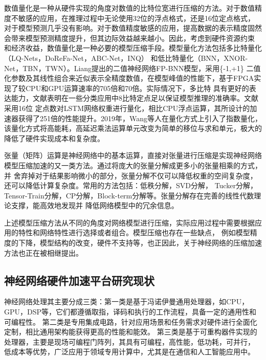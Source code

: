 数值量化是一种从硬件实现的角度对数值的比特位宽进行压缩的方法。对于数值精度不敏感的应用，在推理过程中无论使用32位的浮点格式，还是16位定点格式，
对于模型预测几乎没有影响。对于数值精度敏感的应用，提高数据的表示精度固然会带来模型预测精度提升，但其边际效益越来越小。因此，考虑到硬件资源约束
和经济收益，数值量化是一种必要的模型压缩手段。模型量化方法包括多比特量化（LQ-Nets，DoReFa-Net，ABC-Net，INQ）
和低比特量化（BNN，XNOR-Net，TBN，TWN）。Liang提出的二值神经网络FP-BNN模型，采用\{-1,+1\}
二值化参数及其线性组合来近似表示全精度数值，在模型峰值的性能下，基于FPGA实现了较CPU和GPU运算速率的705倍和70倍。实际情况下，多比特
具有更好的表达能力，文献表明在一些分类应用中8比特定点足以保证模型推理的准确率。文献采用16位
定点数对LSTM网络权重进行量化，相比CPU浮点运算，其所设计的加速器获得了251倍的性能提升。2019年，Wang等人在量化方式上引入了指数量化，
该量化方式将高能耗，高延迟乘法运算单元改变为简单的移位与求和单元，极大的降低了硬件实现成本和复杂度。

张量（矩阵）运算是神经网络中的基本运算，直接对张量进行压缩是实现神经网络模型压缩加速的又一类方法。通过将庞大的张量分解成更多小的张量相乘的方式，并
舍弃掉对于结果影响微小的部分，张量分解不仅可以降低权重的空间复杂度，还可以降低计算复杂度。常用的方法包括：低秩分解，SVD分解，
Tucker分解，Tensor-Train分解，CP分解，Block-term分解等。张量分解存在完善的线性代数理论支撑，能高效地发现并
降低网络模型中的冗余信息。

上述模型压缩方法从不同的角度对网络模型进行压缩，实际应用过程中需要根据应用的特性和网络特性进行选择或者组合。模型压缩也存在一些缺点，
例如模型精度的下降，模型结构的改变，硬件不支持等，也正因此，关于神经网络的压缩加速方法也正在被相继提出。

\subsection{神经网络硬件加速平台研究现状}
神经网络处理其主要分成三类：第一类是基于冯诺伊曼通用处理器，如CPU，GPU，DSP等，它们都遵循取指，译码和执行的工作流程，具备一定的通用性和可编程性。
第二类是专用集成电路，针对应用场景和任务需求对硬件进行全面化定制，相比通用架构能获得更高的性能和能效。
第三类是基于可重构器件实现的处理器，主要是现场可编程门阵列，其具有可编程，高性能，低功耗，可并行，
低成本等优势，广泛应用于领域专用计算中，尤其是在通信和人工智能应用中。

